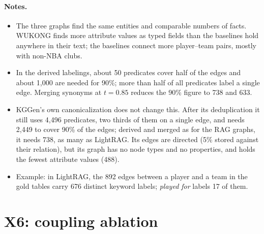 \documentclass[11pt]{article}
\newcommand{\wk}{WUKONG}
\begin{document}
\paragraph{Notes.}
\begin{itemize}
  \item The three graphs find the same entities and comparable numbers of facts. \wk{} finds more
    attribute values as typed fields than the baselines hold anywhere in their text; the baselines
    connect more player--team pairs, mostly with non-NBA clubs.
  \item In the derived labelings, about 50 predicates cover half of the edges and about 1,000 are
    needed for 90\%; more than half of all predicates label a single edge. Merging synonyms at
    $t = 0.85$ reduces the 90\% figure to 738 and 633.
  \item KGGen's own canonicalization does not change this. After its deduplication it still uses
    4,496 predicates, two thirds of them on a single edge, and needs 2,449 to cover 90\% of the
    edges; derived and merged as for the RAG graphs, it needs 738, as many as LightRAG. Its edges
    are directed (5\% stored against their relation), but its graph has no node types and no
    properties, and holds the fewest attribute values (488).
  \item Example: in LightRAG, the 892 edges between a player and a team in the gold tables carry 676
    distinct keyword labels; \emph{played for} labels 17 of them.
\end{itemize}

\section{X6: coupling ablation}
\label{sec:x6}
\end{document}
